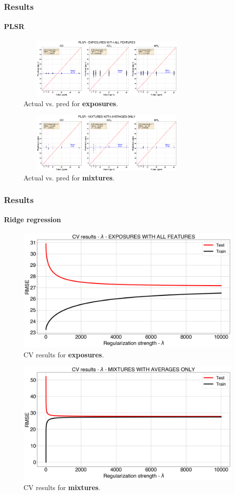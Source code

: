 \documentclass{beamer}
\begin{document}
\begin{frame}
	\frametitle{Results}
	\framesubtitle{PLSR}
	
	\begin{figure}
		\includegraphics[width=0.8\textwidth, height = 3cm, keepaspectratio]{../../figures/plsr-act-vs-pred.png}
		\caption{Actual vs. pred for \textbf{exposures}.}
	\end{figure}
	
	\begin{figure}
		\includegraphics[width=0.8\textwidth, height = 3cm, keepaspectratio]{../../figures/plsr-act-vs-pred-avg-feat.png}
		\caption{Actual vs. pred for \textbf{mixtures}.}
	\end{figure}
	
\end{frame}

\begin{frame}
	\frametitle{Results}
	\framesubtitle{Ridge regression}
	
		\begin{figure}
		\includegraphics[width=0.5\linewidth]{../../figures/ridge-cv.png}
		\caption{CV results for \textbf{exposures}.}
	\end{figure}
	
	\begin{figure}
		\includegraphics[width=0.5\linewidth]{../../figures/ridge-cv-avg-feat.png}
		\caption{CV results for \textbf{mixtures}.}
	\end{figure}
	
\end{frame}
\end{document}
